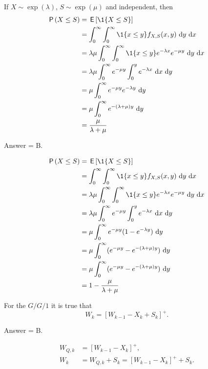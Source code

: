 \begin{exercise}[201704] %
 If $X\sim \exp(\lambda)$, $S\sim\exp(\mu)$ and independent, 
then
\begin{equation*}
 \begin{split}
 \P{X\leq S} 
&= \E{\1{X\leq S}} \\
&= \int_0^\infty \int_0^\infty \1{x\leq y} f_{X,S}(x,y)\, \d y\,\d x\\
&= \lambda \mu \int_0^\infty \int_0^\infty \1{x\leq y} e^{-\lambda x} e^{-\mu y} \, \d y\,\d x\\
&= \lambda \mu \int_0^\infty e^{-\mu y} \int_0^y e^{-\lambda x}\, \d x \, \d y \\
&= \mu \int_0^\infty e^{-\mu y} e^{-\lambda y}\,\d y\\
&= \mu \int_0^\infty e^{-(\lambda +\mu)y} \,\d y\\
&= \frac{\mu}{\lambda + \mu} 
 \end{split}
\end{equation*}

\begin{solution}
Answer = B.

\begin{equation*}
 \begin{split}
 \P{X\leq S} 
&= \E{\1{X\leq S}} \\
&= \int_0^\infty \int_0^\infty \1{x\leq y} f_{X,S}(x,y)\, \d y\,\d x\\
&= \lambda \mu \int_0^\infty \int_0^\infty \1{x\leq y} e^{-\lambda x} e^{-\mu y} \, \d y\,\d x\\
&= \lambda \mu \int_0^\infty e^{-\mu y} \int_0^y e^{-\lambda x}\, \d x \, \d y \\
&= \mu \int_0^\infty e^{-\mu y} (1-e^{-\lambda y})\,\d y\\
&= \mu \int_0^\infty (e^{-\mu y} - e^{-(\lambda +\mu)y} ) \,\d y\\
&= \mu \int_0^\infty (e^{-\mu y} - e^{-(\lambda +\mu)y} ) \,\d y\\
&= 1 - \frac{\mu}{\lambda + \mu} 
 \end{split}
\end{equation*}

\end{solution}
\end{exercise}

\begin{exercise}[201704] %
For the $G/G/1$ it is true that
\begin{equation*}
 W_{k} = [W_{k-1} - X_k + S_k]^+.
\end{equation*}

\begin{solution}
 Answer = B.

\begin{equation}
 \begin{split}
 W_{Q,k} &= [W_{k-1} - X_k]^+,\\
 W_{k} &= W_{Q,k} + S_k = [W_{k-1} - X_k]^+ + S_k.
 \end{split}
\end{equation}
\end{solution}
\end{exercise}

